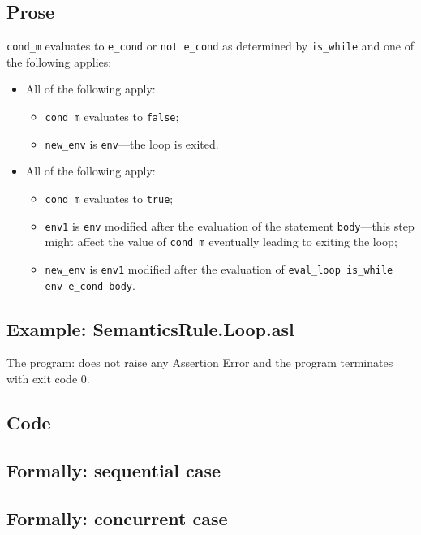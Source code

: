 \documentclass{book}
\begin{document}
    \subsection{Prose}
    \texttt{cond\_m} evaluates to \texttt{e\_cond} or \texttt{not e\_cond} as
determined by \texttt{is\_while} and one of the following applies:
    \begin{itemize}
    \item All of the following apply:
      \begin{itemize}
      \item \texttt{cond\_m} evaluates to \texttt{false};
      \item \texttt{new\_env} is \texttt{env}---the loop is exited. 
      \end{itemize}
    \item All of the following apply:
      \begin{itemize}
      \item \texttt{cond\_m} evaluates to \texttt{true};
      \item \texttt{env1} is \texttt{env} modified after the evaluation of the
statement \texttt{body}---this step might affect the value of \texttt{cond\_m}
eventually leading to exiting the loop;
      \item \texttt{new\_env} is \texttt{env1} modified after the evaluation of
\texttt{eval\_loop is\_while env e\_cond body}.
      \end{itemize}
    \end{itemize}

    \subsection{Example: SemanticsRule.Loop.asl}
    The program:
    does not raise any Assertion Error and the program terminates with exit
    code 0.

    \subsection{Code}

\begin{emptyformal}
    \subsection{Formally: sequential case}

  \subsection{Formally: concurrent case}
\end{emptyformal}
\end{document}
